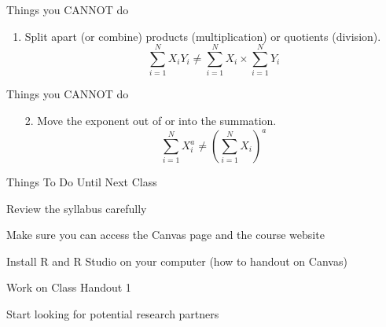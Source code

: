 \documentclass{./../div_teaching_slides}
\begin{document}
\begin{frame}{Things you CANNOT do}
\begin{enumerate}
\item Split apart (or combine) products (multiplication) or quotients (division).
$$ \sum_{i=1}^N X_i Y_i \neq  \sum_{i=1}^N X_i \times \sum_{i=1}^N Y_i   $$
\end{enumerate}
\end{frame}

\begin{frame}{Things you CANNOT do}
\begin{enumerate}
\item[2.] Move the exponent out of or into the summation.
$$ \sum_{i=1}^N X_i^a \neq  \left(\sum_{i=1}^N X_i\right)^a $$
\end{enumerate}
\end{frame}

\begin{frame}{Things To Do Until Next Class}
\begin{wenumerate}
\item Review the syllabus carefully
\item Make sure you can access the Canvas page and the course website
\item Install R and R Studio on your computer (how to handout on Canvas)
\item Work on Class Handout 1
\item Start looking for potential research partners 
\end{wenumerate}
\end{frame}
\end{document}
